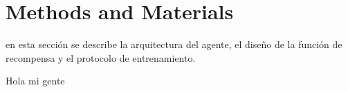 \section{Methods and Materials}

en esta sección se describe la arquitectura del agente, el diseño de la función de recompensa y el protocolo de entrenamiento.

Hola mi gente 
